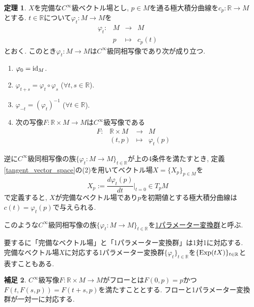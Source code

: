 \documentclass[dvipdfmx,a4paper,11pt]{article}
\newcommand{\R}{\mathbb{R}}
\theoremstyle{definition}
\newtheorem{thm}{定理}
\newtheorem{rem}[thm]{補足}
\newcommand{\drv}[2]{\frac{d #1}{d#2}}
\begin{document}
    \begin{tcolorbox}[
    colback = white,
    colframe = green!35!black,
    fonttitle = \bfseries,
    breakable = true]
    \begin{thm}
      $X$を完備な$C^{\infty}$級ベクトル場とし, $p \in M$を通る極大積分曲線を$c_{p} : \R \rightarrow M$とする.
      $t \in \R$について$\varphi_{t} : M \rightarrow M$を
      $$
      \begin{matrix}
      \varphi_{t} : &M & \rightarrow &M\\
      &p & \mapsto&c_{p}(t) 
       \end{matrix}
      $$
      とおく. このとき$\varphi_{t} : M \rightarrow M$は$C^{\infty}$級同相写像であり次が成り立つ. 
      \begin{enumerate}
          \setlength{\parskip}{0cm}
  \setlength{\itemsep}{2pt} 
      \item $\varphi_{0} = {\rm id}_{M}$.
      \item $\varphi_{t+s} = \varphi_{t} \circ \varphi_{s}$ ($\forall t,s \in \R$).
      \item $\varphi_{-t} = (\varphi_{t})^{-1}$ ($\forall t \in \R$).
      \item   次の写像$F : \R \times M \rightarrow M$は$C^{\infty}$級写像である
  $$
      \begin{matrix}
      F: &\R \times M & \rightarrow &M\\
      &(t,p) & \mapsto&\varphi_{t}(p)
       \end{matrix}
      $$
      \end{enumerate}   
   逆に$C^{\infty}$級同相写像の族$\{ \varphi_{t} : M \rightarrow M \}_{t \in \R}$が上の4条件を満たすとき, 定義\ref{tangent_vector_space}の(2)を用いてベクトル場$X=\{ X_{p}\}_{p \in M}$を
   $$
   X_p := \drv{\varphi_{t}(p)}{t}\Bigr|_{t=0} \in T_{p}M
   $$
   で定義すると, $X$が完備なベクトル場であり$p$を初期値とする極大積分曲線は$c(t)=\varphi_{t}(p)$で与えられる.
   
 このような$C^{\infty}$級同相写像の族$\{ \varphi_{t} : M \rightarrow M \}_{t \in \R}$を\underline{1パラメーター変換群}と呼ぶ. 
    \end{thm}
    \end{tcolorbox}
 
 要するに「完備なベクトル場」と「1パラメーター変換群」は1対1に対応する. 完備なベクトル場$X$に対応する1パラメーター変換群$\{ \varphi_{t} \}_{t \in \R}$を$\{ {\rm Exp}(tX)\}_{t \in \R}$と表すこともある.
 \begin{rem}
 $C^{\infty}$級写像$F : \R \times M \rightarrow M$がフローとは$F(0, p)=p$かつ$F(t, F(s,p))=F(t+s, p)$を満たすこととする. 
 フローと1パラメーター変換群が一対一に対応する. 
 \end{rem}
 
\end{document}
